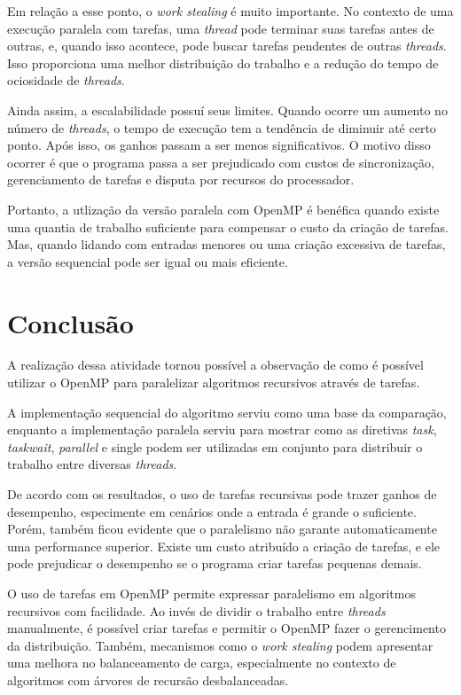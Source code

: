 \documentclass[
    12pt,
    oneside,
    a4paper,
    brazil
]{abntex2}
\begin{document}
Em relação a esse ponto, o \textit{work stealing} é muito importante. No contexto de uma execução paralela com tarefas, uma \textit{thread} pode terminar suas tarefas antes de outras, e, quando isso acontece, pode buscar tarefas pendentes de outras \textit{threads}. Isso proporciona uma melhor distribuição do trabalho e a redução do tempo de ociosidade de \textit{threads}.

Ainda assim, a escalabilidade possuí seus limites. Quando ocorre um aumento no número de \textit{threads}, o tempo de execução tem a tendência de diminuir até certo ponto. Após isso, os ganhos passam a ser menos significativos. O motivo disso ocorrer é que o programa passa a ser prejudicado com custos de sincronização, gerenciamento de tarefas e disputa por recursos do processador.

Portanto, a utlização da versão paralela com OpenMP é benéfica quando existe uma quantia de trabalho suficiente para compensar o custo da criação de tarefas. Mas, quando lidando com entradas menores ou uma criação excessiva de tarefas, a versão sequencial pode ser igual ou mais eficiente.


\chapter{Conclusão}

A realização dessa atividade tornou possível a observação de como é possível utilizar o OpenMP para paralelizar algoritmos recursivos através de tarefas. 

A implementação sequencial do algoritmo serviu como uma base da comparação, enquanto a implementação paralela serviu para mostrar como as diretivas \textit{task}, \textit{taskwait}, \textit{parallel} e single podem ser utilizadas em conjunto para distribuir o trabalho entre diversas \textit{threads}.

De acordo com os resultados, o uso de tarefas recursivas pode trazer ganhos de desempenho, especimente em cenários onde a entrada é grande o suficiente. Porém, também ficou evidente que o paralelismo não garante automaticamente uma performance superior. Existe um custo atribuído a criação de tarefas, e ele pode prejudicar o desempenho se o programa criar tarefas pequenas demais.

O uso de tarefas em OpenMP permite expressar paralelismo em algoritmos recursivos com facilidade. Ao invés de dividir o trabalho entre \textit{threads} manualmente, é possível criar tarefas e permitir o OpenMP fazer o gerencimento da distribuição. Também, mecanismos como o \textit{work stealing} podem apresentar uma melhora no balanceamento de carga, especialmente no contexto de algoritmos com árvores de recursão desbalanceadas.
\end{document}
